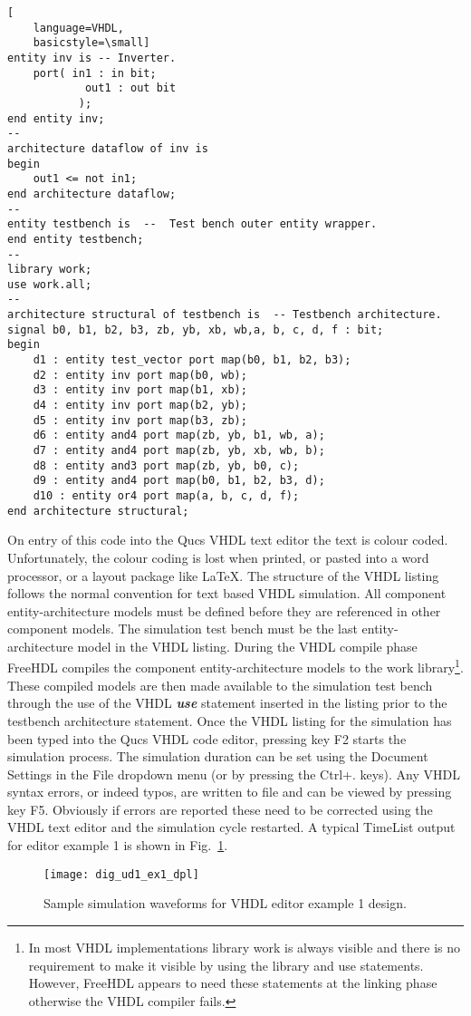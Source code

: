 \begin{itemize}
\begin{lstlisting}[
    language=VHDL,
    basicstyle=\small]
entity inv is -- Inverter.
	port( in1 : in bit;
	        out1 : out bit
	       );
end entity inv;
--
architecture dataflow of inv is
begin 
	out1 <= not in1;
end architecture dataflow;
--
entity testbench is  --  Test bench outer entity wrapper.
end entity testbench;
--
library work;
use work.all;
--
architecture structural of testbench is  -- Testbench architecture.
signal b0, b1, b2, b3, zb, yb, xb, wb,a, b, c, d, f : bit;
begin
	d1 : entity test_vector port map(b0, b1, b2, b3);
	d2 : entity inv port map(b0, wb);
	d3 : entity inv port map(b1, xb);
	d4 : entity inv port map(b2, yb);
	d5 : entity inv port map(b3, zb);
	d6 : entity and4 port map(zb, yb, b1, wb, a);
	d7 : entity and4 port map(zb, yb, xb, wb, b);
	d8 : entity and3 port map(zb, yb, b0, c);
	d9 : entity and4 port map(b0, b1, b2, b3, d);
	d10 : entity or4 port map(a, b, c, d, f);
end architecture structural;
\end{lstlisting}

On entry of this code into the Qucs VHDL text editor the text is
colour coded.  Unfortunately, the colour coding is lost when printed,
or pasted into a word processor, or a layout package like LaTeX.  The
structure of the VHDL listing follows the normal convention for text
based VHDL simulation.  All component entity-architecture models must
be defined before they are referenced in other component models. The
simulation test bench must be the last entity-architecture model in
the VHDL listing.  During the VHDL compile phase FreeHDL compiles the
component entity-architecture models to the work library\footnote{In
most VHDL implementations library work is always visible and there is
no requirement to make it visible by using the library and use
statements.  However, FreeHDL appears to need these statements at the
linking phase otherwise the VHDL compiler fails.  }.  These compiled
models are then made available to the simulation test bench through
the use of the VHDL\textbf{\textit{ use}} statement inserted in the
listing prior to the testbench architecture statement.  Once the VHDL
listing for the simulation has been typed into the Qucs VHDL code
editor, pressing key F2 starts the simulation process.  The simulation
duration can be set using the Document Settings in the File dropdown
menu (or by pressing the Ctrl+. keys).  Any VHDL syntax errors, or
indeed typos, are written to file and can be viewed by pressing key
F5.  Obviously if errors are reported these need to be corrected using
the VHDL text editor and the simulation cycle restarted.  A typical
TimeList output for editor example 1 is shown in
Fig.~\ref{fig:dig_ud1_ex1_dpl}.

 \begin{figure}[ht]
  \centering
  \texttt{[image: dig\_ud1\_ex1\_dpl]}
  \caption{Sample simulation waveforms for VHDL editor example 1 design.}
  \label{fig:dig_ud1_ex1_dpl}
\end{figure} 

\end{itemize}

